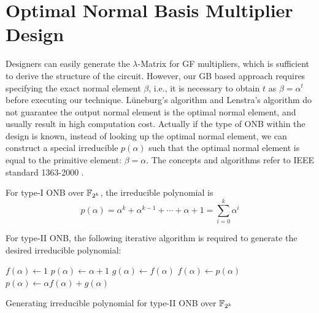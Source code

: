 \section{Optimal Normal Basis Multiplier Design}
Designers can easily generate the $\lambda$-Matrix for GF multipliers, which is sufficient to derive the 
structure of the circuit. However, our GB based approach requires specifying the exact normal element $\beta$,
i.e., it is necessary to obtain $t$ as $\beta = \alpha^t$ before executing our technique.
L\"uneburg's algorithm and Lenstra's algorithm do not guarantee the output normal element is the optimal 
normal element, and usually result in high computation cost. Actually if the type of ONB within the design 
is known, instead of looking up the optimal normal element, we can construct a special irreducible $p(\alpha)$
such that the optimal normal element is equal to the primitive element: $\beta=\alpha$. The concepts and algorithms 
refer to IEEE standard 1363-2000 \cite{IEEE1363}.

For type-I ONB over ${\mathbb{F}}_{2^k}$, the irreducible polynomial is 
$$p(\alpha) = \alpha^k+\alpha^{k-1}+\cdots+\alpha+1
= \sum_{i=0}^k \alpha^i$$ 

For type-II ONB, the following iterative algorithm is required to generate the desired 
irreducible polynomial:

\begin{algorithm}[H]
\SetAlgoNoLine
\LinesNumbered

  $f(\alpha)\gets 1$\;
  $p(\alpha)\gets \alpha+1$\;
  {
  	$g(\alpha)\gets f(\alpha)$\;
	$f(\alpha)\gets p(\alpha)$\;
	$p(\alpha)\gets \alpha f(\alpha)+g(\alpha)$\;
  }\
\caption {Generating irreducible polynomial for type-II ONB over ${\mathbb{F}}_{2^k}$}
\label{alg:ieee1363}
\end{algorithm}
\DecMargin{1em}
\vspace{0.2in}